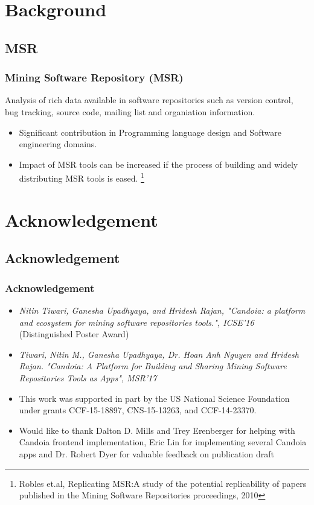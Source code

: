 \section{Background}
\subsection{MSR}
    \begin{frame}
    \frametitle{Mining Software Repository (MSR)}
    Analysis of rich data available in software repositories such as version control, bug
    tracking, source code, mailing list and organiation information.

    \begin{itemize}
        \item Significant contribution in Programming language design and Software engineering domains.
        \item Impact of MSR tools can be increased if the process of building and widely distributing MSR tools is eased.
        \footnote{Robles et.al, Replicating MSR:A study of the potential replicability of papers
        published in the Mining Software Repositories proceedings, 2010}
    \end{itemize}
    \end{frame}

\section{Acknowledgement}
\subsection{Acknowledgement}
        \begin{frame}
        \frametitle{Acknowledgement}
            \begin{itemize}
               \item \tiny{\emph{Nitin Tiwari, Ganesha Upadhyaya, and Hridesh Rajan, "Candoia: a
                platform and ecosystem for mining software repositories tools.",
                ICSE'16}} (Distinguished Poster Award)\\
                \item \tiny{\emph{Tiwari, Nitin M., Ganesha Upadhyaya, Dr. Hoan Anh Nguyen and Hridesh Rajan.
                    "Candoia: A Platform for Building and Sharing Mining Software Repositories Tools as Apps", MSR'17}} \\
                \item This work was supported in part by the US National Science Foundation under grants CCF-15-18897, CNS-15-13263, and CCF-14-23370.
                \item Would like to thank Dalton D. Mills and Trey Erenberger for helping with
                Candoia frontend implementation, Eric Lin for implementing several Candoia apps
                and Dr. Robert Dyer for valuable feedback on publication draft
            \end{itemize}
        \end{frame}



